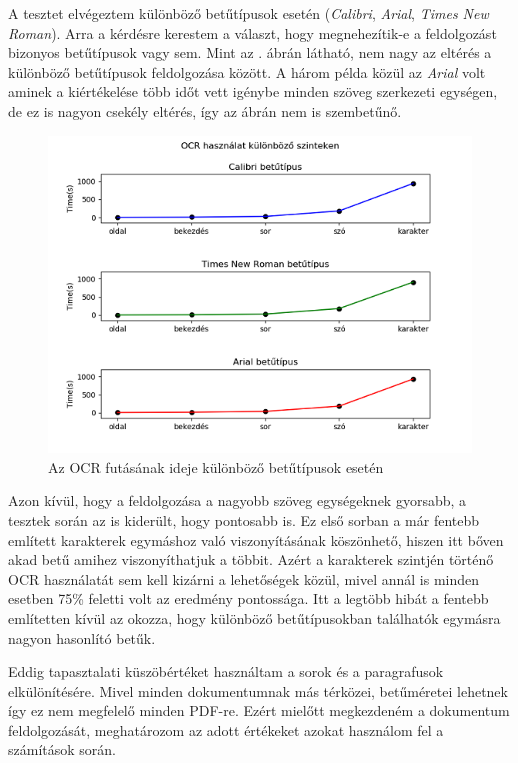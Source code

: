 A tesztet elvégeztem különböző betűtípusok esetén (\textit{Calibri}, \textit{Arial}, \textit{Times New Roman}). Arra a kérdésre kerestem a választ, hogy megnehezítik-e a feldolgozást bizonyos betűtípusok vagy sem. Mint az . ábrán látható, nem nagy az eltérés a különböző betűtípusok feldolgozása között. A három példa közül az \textit{Arial} volt aminek a kiértékelése több időt vett igénybe minden szöveg szerkezeti egységen, de ez is nagyon csekély eltérés, így az ábrán nem is szembetűnő.

\begin{figure}[h!]
\centering
\includegraphics[scale=1]{images/test_ocr_font_types.png}
\caption{Az OCR futásának ideje különböző betűtípusok esetén}
\label{fig:test_font}
\end{figure}

Azon kívül, hogy a feldolgozása a nagyobb szöveg egységeknek gyorsabb, a tesztek során az is kiderült, hogy pontosabb is. Ez első sorban a már fentebb említett karakterek egymáshoz való viszonyításának köszönhető, hiszen itt bőven akad betű amihez viszonyíthatjuk a többit. Azért a karakterek szintjén történő OCR használatát sem kell kizárni a lehetőségek közül, mivel annál is minden esetben 75\% feletti volt az eredmény pontossága. Itt a legtöbb hibát a fentebb említetten kívül az okozza, hogy különböző betűtípusokban találhatók egymásra nagyon hasonlító betűk.


Eddig tapasztalati küszöbértéket használtam a sorok és a paragrafusok elkülönítésére. Mivel minden dokumentumnak más térközei, betűméretei lehetnek így ez nem megfelelő minden PDF-re. Ezért mielőtt megkezdeném a dokumentum feldolgozását, meghatározom az adott értékeket azokat használom fel a számítások során.

